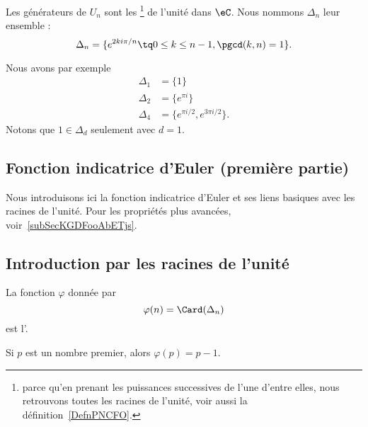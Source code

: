 \begin{definition}\label{DefLYGTooFPOYGZ}
	Les générateurs de \( U_n\) sont les \footnote{parce qu'en prenant les puissances successives de l'une d'entre elles, nous retrouvons toutes les racines de l'unité, voir aussi la définition~\ref{DefnPNCFO}.} de l'unité dans \( \eC\). Nous nommons \( \Delta_n\) leur ensemble :
	\begin{equation}
		\Delta_n=\{  e^{2ki\pi/n}\tq 0\leq k\leq n-1,\pgcd(k,n)=1 \}.
	\end{equation}
\end{definition}
Nous avons par exemple
\begin{subequations}
	\begin{align}
		\Delta_1 & =\{ 1 \}                          \\
		\Delta_2 & =\{ e^{\pi i} \}                  \\
		\Delta_4 & =\{ e^{\pi i/2}, e^{3\pi i/2} \}.
	\end{align}
\end{subequations}
Notons que \( 1\in \Delta_d\) seulement avec \( d=1\).

\subsection{Fonction indicatrice d'Euler (première partie)}

Nous introduisons ici la fonction indicatrice d'Euler et ses liens basiques avec les racines de l'unité. Pour les propriétés plus avancées, voir~\ref{subSecKGDFooAbETjs}.

\subsection{Introduction par les racines de l'unité}

\begin{definition}      \label{DEFooWYIGooRVBTil}
	La fonction \( \varphi\) donnée par
	\begin{equation}    \label{EqEulerGqPsvi}
		\varphi(n)=\Card(\Delta_n)
	\end{equation}
	est l'.
\end{definition}
Si \( p\) est un nombre premier, alors \( \varphi(p)=p-1\).

